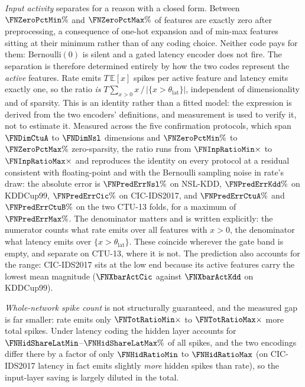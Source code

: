 \emph{Input activity} separates for a reason with a closed form. Between
$\FNZeroPctMin\%$ and $\FNZeroPctMax\%$ of features are exactly zero after
preprocessing, a consequence of one-hot expansion and of min-max features
sitting at their minimum rather than of any coding choice. Neither code pays for
them: $\mathrm{Bernoulli}(0)$ is silent and a gated latency encoder does not
fire. The separation is therefore determined entirely by how the two codes
represent the \emph{active} features. Rate emits $T\,\mathbb{E}[x]$ spikes per
active feature and latency emits exactly one, so the ratio \emph{is}
$T\sum_{x>0}x\,/\,|\{x>\theta_\mathrm{lat}\}|$, independent of dimensionality
and of sparsity. This is an identity rather than a fitted model: the expression
is derived from the two encoders' definitions, and measurement is used to verify
it, not to estimate it. Measured across the five confirmation protocols, which span
$\FNDimCtuA$ to $\FNDimNsl$ dimensions and $\FNZeroPctMin\%$ to
$\FNZeroPctMax\%$ zero-sparsity, the ratio runs from $\FNInpRatioMin\times$ to
$\FNInpRatioMax\times$ and reproduces the identity on every protocol at a
residual consistent with floating-point and with the Bernoulli sampling noise in
rate's draw: the
absolute error is $\FNPredErrNsl\%$ on NSL-KDD, $\FNPredErrKdd\%$ on KDDCup99,
$\FNPredErrCic\%$ on CIC-IDS2017, and $\FNPredErrCtuA\%$ and $\FNPredErrCtuB\%$
on the two CTU-13 folds, for a maximum of $\FNPredErrMax\%$. The denominator
matters and is written explicitly: the numerator counts what rate emits over all
features with $x>0$, the denominator what latency emits over
$\{x>\theta_\mathrm{lat}\}$. These coincide wherever the gate band is empty, and
separate on CTU-13, where it is not.
The prediction also accounts for the range: CIC-IDS2017 sits at the low end
because its active features carry the lowest mean magnitude ($\FNXbarActCic$
against $\FNXbarActKdd$ on KDDCup99).

\emph{Whole-network spike count} is not structurally guaranteed, and the measured
gap is far smaller: rate emits only $\FNTotRatioMin\times$ to
$\FNTotRatioMax\times$ more total spikes. Under latency coding the hidden layer
accounts for $\FNHidShareLatMin$--$\FNHidShareLatMax\%$ of all spikes, and the
two encodings differ there by a factor of only $\FNHidRatioMin$ to
$\FNHidRatioMax$ (on CIC-IDS2017 latency in fact emits slightly \emph{more}
hidden spikes than rate), so the input-layer saving is largely diluted in the
total.

